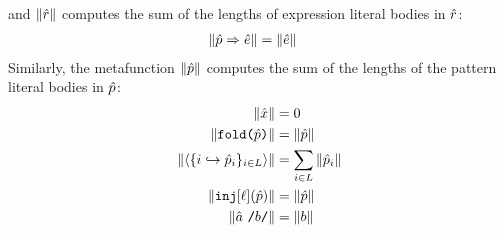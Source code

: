 \vspace{-3px}\begin{grayparbox}\vspace{3px}and $\Vert \hat{r} \Vert$ computes the sum of the lengths of expression literal bodies in $\hat{r}$:
\begin{align*}
\Vert \hat{p} \Rightarrow {\hat e} \Vert & = \Vert {\hat e} \Vert
\end{align*}
Similarly, the metafunction $\Vert \hat{p} \Vert$ computes the sum of the lengths of the pattern literal bodies in $\hat{p}$:
\begin{align*}
\Vert {\hat x} \Vert & = 0\\
\Vert \texttt{fold}\texttt{(}\hat{p}\texttt{)} \Vert & = \Vert \hat{p} \Vert\\
\Vert \langle \{i \hookrightarrow \hat{p}_{i}\}_{i \in L} \rangle \Vert & = \sum_{i \in L} \Vert \hat{p}_i \Vert\\
\Vert \texttt{inj}[\ell](\hat{p}) \Vert & = \Vert \hat{p} \Vert\\
\Vert \hat{a}~\texttt{/}b\texttt{/} \Vert & = \Vert b \Vert
\end{align*}
\end{grayparbox}

